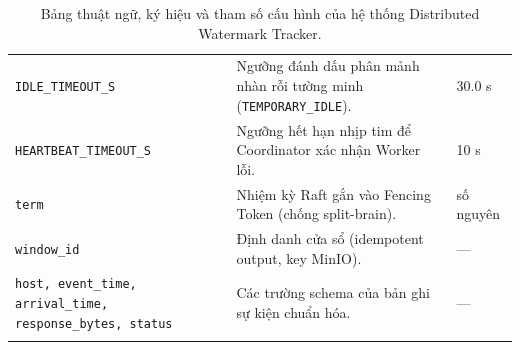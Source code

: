 \documentclass[12pt,a4paper]{article}
\begin{document}
\begin{longtable}{p{} p{} p{}}
\texttt{IDLE\_TIMEOUT\_S} & Ngưỡng đánh dấu phân mảnh nhàn rỗi tường minh (\texttt{TEMPORARY\_IDLE}). & 30.0 s \\
\texttt{HEARTBEAT\_TIMEOUT\_S} & Ngưỡng hết hạn nhịp tim để Coordinator xác nhận Worker lỗi. & 10 s \\
\texttt{term} & Nhiệm kỳ Raft gắn vào Fencing Token (chống split-brain). & số nguyên \\
\texttt{window\_id} & Định danh cửa sổ (idempotent output, key MinIO). & --- \\
\texttt{host, event\_time, arrival\_time, response\_bytes, status} & Các trường schema của bản ghi sự kiện chuẩn hóa. & --- \\
\bottomrule
\caption{Bảng thuật ngữ, ký hiệu và tham số cấu hình của hệ thống Distributed Watermark Tracker.}
\label{tab:glossary}
\end{longtable}

\newpage

\vspace{0.5cm}

\end{document}
